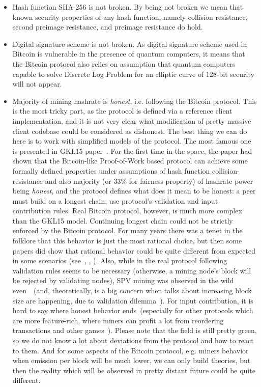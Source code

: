 \documentclass{article}   %
\begin{document}
\begin{itemize}
\item{} Hash function SHA-256 is not broken. By being not broken we mean that known security properties of any hash function, namely collision resistance, second preimage resistance, and preimage resistance do hold.   
\item{} Digital signature scheme is not broken. As digital signature scheme used in Bitcoin is vulnerable in the presence of quantum computers, it means that the Bitcoin protocol also relies on assumption that quantum computers capable to solve Discrete Log Problem for an elliptic curve of 128-bit security will not appear.
\item{} Majority of mining hashrate is {\em honest}, i.e. following the Bitcoin protocol. This is the most tricky part, as the protocol is defined via a reference client implementation, and it is not very clear what modification of pretty massive client codebase could be considered as dishonest. The best thing we can do here is to work with simplified models of the protocol. The most famous one is presented in GKL15 paper~\cite{garay2015bitcoin}.
For the first time in the space, the paper had shown that the Bitcoin-like Proof-of-Work based protocol can achieve some formally defined properties under assumptions of hash function collision-resistance and also majority (or $33\%$ for fairness property) of hashrate power being {\em honest}, and the protocol defines what does it mean to be honest: a peer must build on a longest chain, use protocol's validation and input contribution rules.
Real Bitcoin protocol, however, is much more complex than the GKL15 model. Continuing longest chain could not be strictly enforced by the Bitcoin protocol. For many years there was a tenet in the folklore that this behavior is just the most rational choice, but then some papers did show that rational behavior could be quite different from expected in some scenarios (see~\cite{carlsten2016instability}, \cite{liao2017incentivizing}, \cite{judmayer2021sok}). Also, while in the real protocol following validation rules seems to be necessary (otherwise, a mining node's block will be rejected by validating nodes), SPV mining was observed in the wild even~\cite{BitcoinSPV}~(and, theoretically, is a big concern when talks about increasing block size are happening, due to validation dilemma~\cite{luu2015demystifying}). For input contribution, it is hard to say where honest behavior ends~(especially for other protocols which are more feature-rich, where miners can profit a lot from reordering transactions and other games~\cite{eskandari2020sok}). Please note that the field is still pretty green, so we do not know a lot about deviations from the protocol and how to react to them. And for some aspects of the Bitcoin protocol, e.g. miners behavior when emission per block will be much lower, we can only build theories, but then the reality which will be observed in pretty distant future could be quite different.   
\end{itemize}
\end{document}
